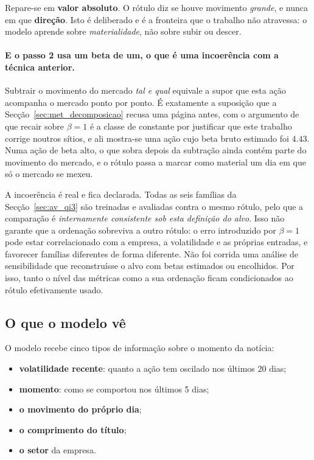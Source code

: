 Repare-se em \textbf{valor absoluto}. O rótulo diz se houve movimento \emph{grande}, e nunca em que
\textbf{direção}. Isto é deliberado e é a fronteira que o trabalho não atravessa: o modelo aprende
sobre \emph{materialidade}, não sobre subir ou descer.

\paragraph{E o passo 2 usa um beta de um, o que é uma incoerência com a técnica anterior.}
Subtrair o movimento do mercado \emph{tal e qual} equivale a supor que esta ação acompanha o
mercado ponto por ponto. É exatamente a suposição que a Secção~\ref{sec:met_decomposicao} recusa
uma página antes, com o argumento de que recair sobre $\beta = 1$ é a classe de constante por
justificar que este trabalho corrige noutros sítios, e ali mostra-se uma ação cujo beta bruto
estimado foi $4.43$. Numa ação de beta alto, o que sobra depois da subtração ainda contém parte do
movimento do mercado, e o rótulo passa a marcar como material um dia em que só o mercado se mexeu.

A incoerência é real e fica declarada. Todas as seis famílias da Secção~\ref{sec:av_qi3} são
treinadas e avaliadas contra o mesmo rótulo, pelo que a comparação é \emph{internamente
consistente sob esta definição do alvo}. Isso não garante que a ordenação sobreviva a outro rótulo:
o erro introduzido por $\beta=1$ pode estar correlacionado com a empresa, a volatilidade e as
próprias entradas, e favorecer famílias diferentes de forma diferente. Não foi corrida uma análise
de sensibilidade que reconstruísse o alvo com betas estimados ou encolhidos. Por isso, tanto o nível
das métricas como a sua ordenação ficam condicionados ao rótulo efetivamente usado.

\subsection{O que o modelo vê}
\label{sec:met_modelo_ve}

O modelo recebe cinco tipos de informação sobre o momento da notícia:

\begin{itemize}
  \item \textbf{volatilidade recente}: quanto a ação tem oscilado nos últimos 20 dias;
  \item \textbf{momento}: como se comportou nos últimos 5 dias;
  \item \textbf{o movimento do próprio dia};
  \item \textbf{o comprimento do título};
  \item \textbf{o setor} da empresa.
\end{itemize}

